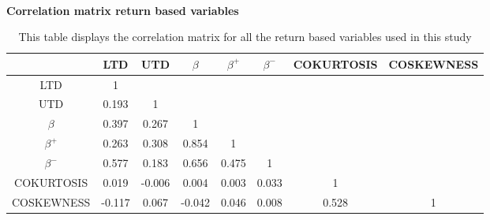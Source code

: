\begin{table}[ht]
\caption{\\ \large{\textbf{Correlation matrix return based variables}}}
\captionsetup{font = footnotesize, justification = justified, width = \linewidth}
\caption*{This table displays the 
                        correlation matrix for all the return
                        based variables used in this study}
\centering
\label{tab:cor_matrix}
\begin{tabular}[t]{cccccccc}
\toprule
 & LTD & UTD & $\beta$ & $\beta^{+}$ & $\beta^{-}$ & COKURTOSIS & COSKEWNESS\\
\midrule
LTD & 1 &  &  &  &  &  & \\
UTD & 0.193 & 1 &  &  &  &  & \\
$\beta$ & 0.397 & 0.267 & 1 &  &  &  & \\
$\beta^{+}$ & 0.263 & 0.308 & 0.854 & 1 &  &  & \\
$\beta^{-}$ & 0.577 & 0.183 & 0.656 & 0.475 & 1 &  & \\
\addlinespace
COKURTOSIS & 0.019 & -0.006 & 0.004 & 0.003 & 0.033 & 1 & \\
COSKEWNESS & -0.117 & 0.067 & -0.042 & 0.046 & 0.008 & 0.528 & 1\\
\bottomrule
\end{tabular}
\end{table}
